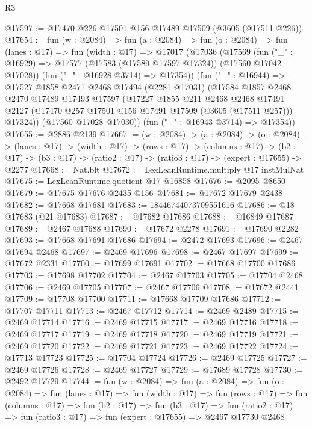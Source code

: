 \begin{lexlean}{R3}
\begin{coremodule}
@17597 := @17470 @226 @17501 @156 @17489 @17509 (@3605 (@17511 @226))
@17654 := fun (w : @2084) =>
  fun (a : @2084) =>
  fun (o : @2084) =>
  fun (lanes : @17) =>
  fun (width : @17) =>
  @17017
    (@17036
      (@17569
        (fun ("_" : @16929) => @17577 (@17583 (@17589 @17597 @17324)) (@17560 @17042 @17028))
        (fun ("_" : @16928 @3714) => @17354))
      (fun ("_" : @16944) =>
      @17527
        @1858
        @2471
        @2468
        @17494
        (@2281 @17031)
        (@17584
          @1857
          @2468
          @2470
          @17489
          @17493
          @17597
          (@17227
            @1855
            @211
            @2468
            @2468
            @17491
            @2127
            (@17470 @257 @17501 @156 @17491 @17509 (@3605 (@17511 @257)))
            @17324))
        (@17560 @17028 @17030))
      (fun ("_" : @16943 @3714) => @17354))
@17655 := @2886 @2139
@17667 := (w : @2084) ->
  (a : @2084) ->
  (o : @2084) ->
  (lanes : @17) ->
  (width : @17) ->
  (rows : @17) ->
  (columns : @17) ->
  (b2 : @17) -> (b3 : @17) -> (ratio2 : @17) -> (ratio3 : @17) -> (expert : @17655) -> @2277
@17668 := Nat.blt
@17672 := LexLeanRuntime.multiply @17 instMulNat
@17675 := LexLeanRuntime.quotient @17 @16858
@17676 := @2095 @8650
@17679 := @17675 @17676 @2435 @156
@17681 := @17672 @17679 @2438
@17682 := @17668 @17681
@17683 := 18446744073709551616
@17686 := @18 @17683 (@21 @17683)
@17687 := @17682 @17686
@17688 := @16849 @17687
@17689 := @2467 @17688
@17690 := @17672 @2278
@17691 := @17690 @2282
@17693 := @17668 @17691 @17686
@17694 := @2472 @17693
@17696 := @2467 @17694 @2468
@17697 := @2469 @17696
@17698 := @2467 @17697
@17699 := @17672 @2331
@17700 := @17699 @17691
@17702 := @17668 @17700 @17686
@17703 := @17698 @17702
@17704 := @2467 @17703
@17705 := @17704 @2468
@17706 := @2469 @17705
@17707 := @2467 @17706
@17708 := @17672 @2441
@17709 := @17708 @17700
@17711 := @17668 @17709 @17686
@17712 := @17707 @17711
@17713 := @2467 @17712
@17714 := @2469 @2489
@17715 := @2469 @17714
@17716 := @2469 @17715
@17717 := @2469 @17716
@17718 := @2469 @17717
@17719 := @2469 @17718
@17720 := @2469 @17719
@17721 := @2469 @17720
@17722 := @2469 @17721
@17723 := @2469 @17722
@17724 := @17713 @17723
@17725 := @17704 @17724
@17726 := @2469 @17725
@17727 := @2469 @17726
@17728 := @2469 @17727
@17729 := @17689 @17728
@17730 := @2492 @17729
@17744 := fun (w : @2084) =>
  fun (a : @2084) =>
  fun (o : @2084) =>
  fun (lanes : @17) =>
  fun (width : @17) =>
  fun (rows : @17) =>
  fun (columns : @17) =>
  fun (b2 : @17) =>
  fun (b3 : @17) =>
  fun (ratio2 : @17) => fun (ratio3 : @17) => fun (expert : @17655) => @2467 @17730 @2468

\end{coremodule}
\end{lexlean}
